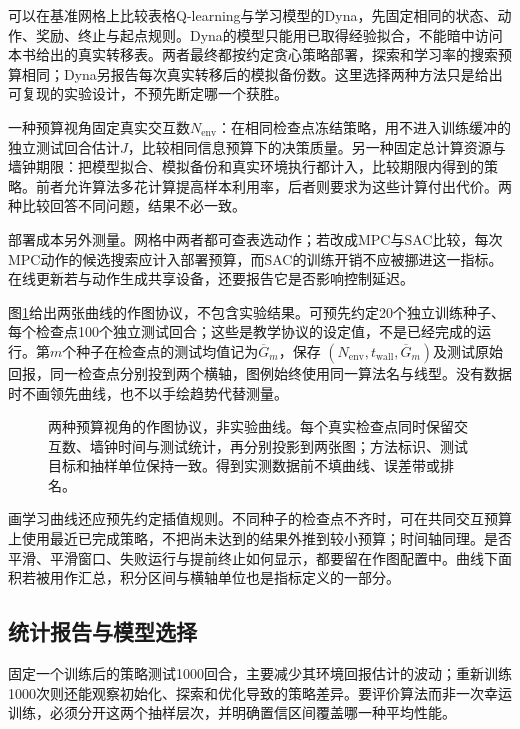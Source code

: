 可以在基准网格上比较表格Q-learning与学习模型的Dyna，先固定相同的状态、动作、奖励、终止与起点规则。Dyna的模型只能用已取得经验拟合，不能暗中访问本书给出的真实转移表。两者最终都按约定贪心策略部署，探索和学习率的搜索预算相同；Dyna另报告每次真实转移后的模拟备份数。这里选择两种方法只是给出可复现的实验设计，不预先断定哪一个获胜。

一种预算视角固定真实交互数$N_{\mathrm{env}}$：在相同检查点冻结策略，用不进入训练缓冲的独立测试回合估计$J$，比较相同信息预算下的决策质量。另一种固定总计算资源与墙钟期限：把模型拟合、模拟备份和真实环境执行都计入，比较期限内得到的策略。前者允许算法多花计算提高样本利用率，后者则要求为这些计算付出代价。两种比较回答不同问题，结果不必一致。

部署成本另外测量。网格中两者都可查表选动作；若改成MPC与SAC比较，每次MPC动作的候选搜索应计入部署预算，而SAC的训练开销不应被挪进这一指标。在线更新若与动作生成共享设备，还要报告它是否影响控制延迟。

图\ref{fig:rl-learning-evaluation-protocol}给出两张曲线的作图协议，不包含实验结果。可预先约定20个独立训练种子、每个检查点100个独立测试回合；这些是教学协议的设定值，不是已经完成的运行。第$m$个种子在检查点的测试均值记为$\overline G_m$，保存
$(N_{\mathrm{env}},t_{\mathrm{wall}},\overline G_m)$及测试原始回报，同一检查点分别投到两个横轴，图例始终使用同一算法名与线型。没有数据时不画领先曲线，也不以手绘趋势代替测量。

\begin{figure}[t]
  \centering
  
  \caption{两种预算视角的作图协议，非实验曲线。每个真实检查点同时保留交互数、墙钟时间与测试统计，再分别投影到两张图；方法标识、测试目标和抽样单位保持一致。得到实测数据前不填曲线、误差带或排名。}
  \label{fig:rl-learning-evaluation-protocol}
\end{figure}

画学习曲线还应预先约定插值规则。不同种子的检查点不齐时，可在共同交互预算上使用最近已完成策略，不把尚未达到的结果外推到较小预算；时间轴同理。是否平滑、平滑窗口、失败运行与提前终止如何显示，都要留在作图配置中。曲线下面积若被用作汇总，积分区间与横轴单位也是指标定义的一部分。

\subsection{统计报告与模型选择}
\label{sec:rl-learning-statistical-report}

固定一个训练后的策略测试1000回合，主要减少其环境回报估计的波动；重新训练1000次则还能观察初始化、探索和优化导致的策略差异。要评价算法而非一次幸运训练，必须分开这两个抽样层次，并明确置信区间覆盖哪一种平均性能。


